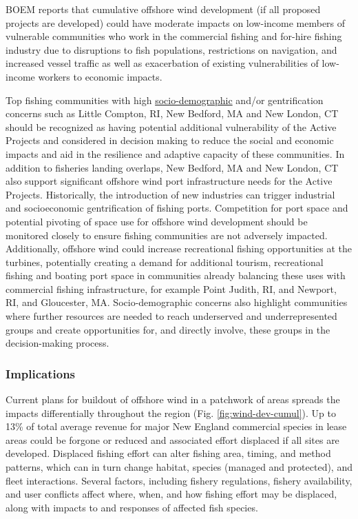 \documentclass[
  10pt,
]{article}
\begin{document}
BOEM reports that cumulative offshore wind development (if all proposed projects are developed) could have moderate impacts on low-income members of vulnerable communities who work in the commercial fishing and for-hire fishing industry due to disruptions to fish populations, restrictions on navigation, and increased vessel traffic as well as exacerbation of existing vulnerabilities of low-income workers to economic impacts.

Top fishing communities with high \href{https://noaa-edab.github.io/catalog/engagement.html}{socio-demographic} and/or gentrification concerns such as Little Compton, RI, New Bedford, MA and New London, CT should be recognized as having potential additional vulnerability of the Active Projects and considered in decision making to reduce the social and economic impacts and aid in the resilience and adaptive capacity of these communities. In addition to fisheries landing overlaps, New Bedford, MA and New London, CT also support significant offshore wind port infrastructure needs for the Active Projects. Historically, the introduction of new industries can trigger industrial and socioeconomic gentrification of fishing ports. Competition for port space and potential pivoting of space use for offshore wind development should be monitored closely to ensure fishing communities are not adversely impacted. Additionally, offshore wind could increase recreational fishing opportunities at the turbines, potentially creating a demand for additional tourism, recreational fishing and boating port space in communities already balancing these uses with commercial fishing infrastructure, for example Point Judith, RI, and Newport, RI, and Gloucester, MA. Socio-demographic concerns also highlight communities where further resources are needed to reach underserved and underrepresented groups and create opportunities for, and directly involve, these groups in the decision-making process.

\subsubsection{Implications}\label{implications-6}

Current plans for buildout of offshore wind in a patchwork of areas spreads the impacts differentially throughout the region (Fig. \ref{fig:wind-dev-cumul}). Up to 13\% of total average revenue for major New England commercial species in lease areas could be forgone or reduced and associated effort displaced if all sites are developed. Displaced fishing effort can alter fishing area, timing, and method patterns, which can in turn change habitat, species (managed and protected), and fleet interactions. Several factors, including fishery regulations, fishery availability, and user conflicts affect where, when, and how fishing effort may be displaced, along with impacts to and responses of affected fish species.
\end{document}
